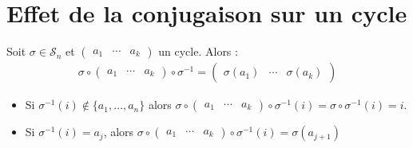 \documentclass[../main.tex]{subfiles}
\begin{document}
\section{Effet de la conjugaison sur un cycle}
\begin{tcolorbox}[title=Théorème 28.40, title filled=false, colframe=orange, colback=orange!10!white]
    Soit $\sigma\in \mathcal{S}_n$ et $\begin{pmatrix}
        a_1 & \cdots & a_k
    \end{pmatrix}$ un cycle. Alors : 
    \begin{align*}
        \sigma\circ \begin{pmatrix}
            a_1 & \cdots & a_k
        \end{pmatrix} \circ \sigma^{-1} = \begin{pmatrix}
            \sigma(a_1) & \cdots & \sigma(a_k)
        \end{pmatrix}
    \end{align*}
\end{tcolorbox}

\begin{itemize}
    \item Si $\sigma^{-1}(i) \not\in \{a_1, \ldots, a_n\}$ alors $\sigma\circ \begin{pmatrix}
        a_1 & \cdots & a_k
    \end{pmatrix} \circ \sigma^{-1}(i) = \sigma\circ \sigma^{-1}(i) = i$. 
    \item Si $\sigma^{-1}(i) = a_j$, alors $\sigma\circ \begin{pmatrix}
        a_1 & \cdots & a_k
    \end{pmatrix} \circ \sigma^{-1}(i) =  \sigma(a_{j+1})$
\end{itemize}
\end{document}
